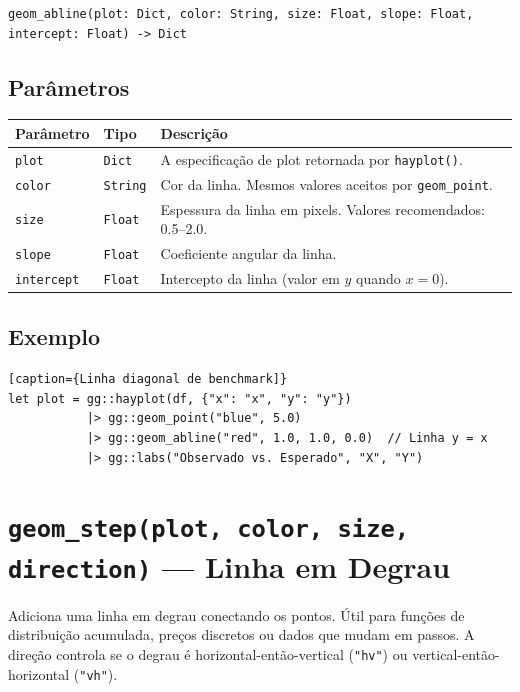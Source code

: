\documentclass[12pt, a4paper, oneside]{book}
\newcommand{\code}[1]{\texttt{#1}}
\begin{document}
\begin{lstlisting}[style=inline]
geom_abline(plot: Dict, color: String, size: Float, slope: Float, intercept: Float) -> Dict
\end{lstlisting}

\subsection*{Parâmetros}

\begin{tabularx}{\textwidth}{@{}lL{2.5cm}X@{}}
  \toprule
  \textbf{Parâmetro} & \textbf{Tipo} & \textbf{Descrição} \\
  \midrule
  \code{plot}      & \code{Dict}   & A especificação de plot retornada por \code{hayplot()}. \\[4pt]
  \code{color}     & \code{String} & Cor da linha. Mesmos valores aceitos por \code{geom\_point}. \\[4pt]
  \code{size}      & \code{Float}  & Espessura da linha em pixels. Valores recomendados: 0.5--2.0. \\[4pt]
  \code{slope}     & \code{Float}  & Coeficiente angular da linha. \\[4pt]
  \code{intercept} & \code{Float}  & Intercepto da linha (valor em $y$ quando $x=0$). \\
  \bottomrule
\end{tabularx}

\subsection*{Exemplo}

\begin{lstlisting}[caption={Linha diagonal de benchmark]}
let plot = gg::hayplot(df, {"x": "x", "y": "y"})
           |> gg::geom_point("blue", 5.0)
           |> gg::geom_abline("red", 1.0, 1.0, 0.0)  // Linha y = x
           |> gg::labs("Observado vs. Esperado", "X", "Y")
\end{lstlisting}

\section{\texttt{geom\_step(plot, color, size, direction)} --- Linha em Degrau}

Adiciona uma linha em degrau conectando os pontos. Útil para funções de distribuição acumulada,
preços discretos ou dados que mudam em passos. A direção controla se o degrau é horizontal-então-vertical
(\texttt{"hv"}) ou vertical-então-horizontal (\texttt{"vh"}).
\end{document}
